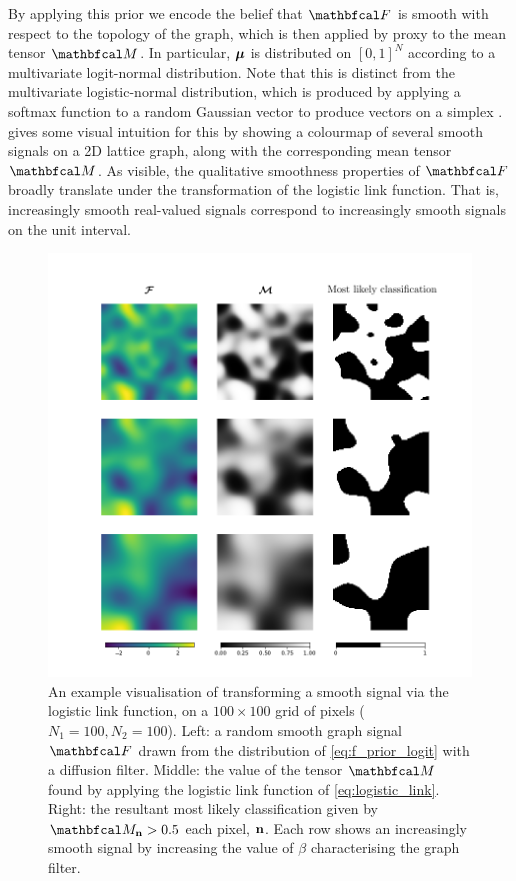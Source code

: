 By applying this prior we encode the belief that $\Ft$ is smooth with respect to the topology of the graph, which is then applied by proxy to the mean tensor $\Mt$. In particular, $\boldsymbol{\mu}$ is distributed on $[0, 1]^N$ according to a multivariate logit-normal distribution. Note that this is distinct from the multivariate logistic-normal distribution, which is produced by applying a softmax function to a random Gaussian vector to produce vectors on a simplex \citep{Atchinson1980}.  gives some visual intuition for this by showing a colourmap of several smooth signals on a 2D lattice graph, along with the corresponding mean tensor $\Mt$. As visible, the qualitative smoothness properties of $\Ft$ broadly translate under the transformation of the logistic link function. That is, increasingly smooth real-valued signals correspond to increasingly smooth signals on the unit interval. 

\begin{figure}[t] 
    \begin{center}
        \includegraphics[width=0.9
        \linewidth]{Figures/logistic_gsr.pdf}
    \end{center}
    \caption[Visualisation of binary classification on a 2D lattice]{An example visualisation of transforming a smooth signal via the logistic link function, on a $100 \times 100$ grid of pixels ($N_1 = 100, N_2 = 100$). Left: a random smooth graph signal $\Ft$ drawn from the distribution of \cref{eq:f_prior_logit} with a diffusion filter. Middle: the value of the tensor $\Mt$ found by applying the logistic link function of \cref{eq:logistic_link}. Right: the resultant most likely classification given by $\Mt_{\nn} > 0.5$ each pixel, $\mathbf{n}$. Each row shows an increasingly smooth signal by increasing the value of $\beta$ characterising the graph filter. } 
    \label{fig:logistic_gsr}
\end{figure} 

